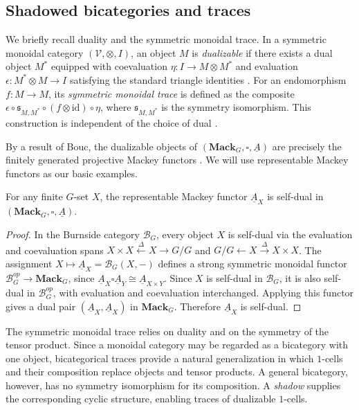 \documentclass[11pt,oneside]{amsart}
\numberwithin{equation}{section}
\numberwithin{figure}{section}
\theoremstyle{plain}
\theoremstyle{definition}
\theoremstyle{remark}
\begin{document}
 \subsection{Shadowed bicategories and traces}
We briefly recall duality and the symmetric monoidal trace. In a symmetric monoidal category $(\mathcal{V}, \otimes, I)$, an object $M$ is \emph{dualizable} if there exists a dual object $M^\ast$ equipped with coevaluation $\eta\colon I \to M \otimes M^{\ast}$ and evaluation $\epsilon\colon M^{\ast}\otimes M \to I$ satisfying the standard triangle identities \cite{DoldPuppe}. For an endomorphism $f\colon M \to M$, its \emph{symmetric monoidal trace} is defined as the composite $\epsilon \circ \mathfrak{s}_{M,M^\ast} \circ (f \otimes \mathrm{id}) \circ \eta$, where $\mathfrak{s}_{M,M^\ast}$ is the symmetry isomorphism. This construction is independent of the choice of dual \cite[Def.~1.2.4]{PSSY}.

By a result of Bouc, the dualizable objects of $(\mathbf{Mack}_G, \square, \underline{A})$ are precisely the finitely generated projective Mackey functors \cite[Lemma~2.2]{boucproj}. We will use representable Mackey functors as our basic examples.

\begin{lemma}\label{lemma:selfdual}
For any finite $G$-set $X$, the representable Mackey functor $\underline{A}_X$ is self-dual in \((\mathbf{Mack}_G, \square, \underline{A})\).
\end{lemma}

\begin{proof}
In the Burnside category \(\mathcal B_G\), every object \(X\) is self-dual via the evaluation and coevaluation spans \(X\times X \xleftarrow{\Delta} X \to G/G\) and \(G/G \leftarrow X \xrightarrow{\Delta} X\times X\). The assignment \(X\mapsto \underline{A}_X=\mathcal B_G(X,-)\) defines a strong symmetric monoidal functor \(\mathcal B_G^{op}\to \mathbf{Mack}_G\), since \(\underline{A}_X\square \underline{A}_Y\cong \underline{A}_{X\times Y}\). Since \(X\) is self-dual in \(\mathcal B_G\), it is also self-dual in \(\mathcal B_G^{op}\), with evaluation and coevaluation interchanged. Applying this functor gives a dual pair \((\underline{A}_X,\underline{A}_X)\) in \(\mathbf{Mack}_G\). Therefore \(\underline{A}_X\) is self-dual.
\end{proof}

The symmetric monoidal trace relies on duality and on the symmetry of the tensor product. Since a monoidal category may be regarded as a bicategory with one object, bicategorical traces provide a natural generalization in which \(1\)-cells and their composition replace objects and tensor products. A general bicategory, however, has no symmetry isomorphism for its composition. A \emph{shadow} supplies the corresponding cyclic structure, enabling traces of dualizable \(1\)-cells.
\end{document}

